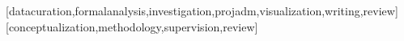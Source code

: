 \documentclass[portuguese]{textolivre}
\begin{document}
\printbibliography\label{sec-bib}


\begin{contributors}
[datacuration,formalanalysis,investigation,projadm,visualization,writing,review]
[conceptualization,methodology,supervision,review]
\end{contributors}
\end{document}
